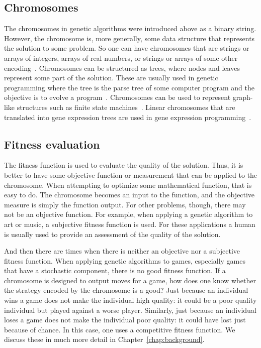 \subsection{Chromosomes}

The chromosomes in genetic algorithms were introduced above as a binary string.
However, the chromosome is, more generally, some data structure that represents
the solution to some problem. So one can have chromosomes that are strings or
arrays of integers, arrays of real numbers, or strings or arrays of some other
encoding~\cite{haupt2004practical}. Chromosomes can be structured as trees,
where nodes and leaves represent some part of the solution. These are usually
used in genetic programming where the tree is the parse tree of some computer
program and the objective is to evolve a program~\cite{koza1992genetic}.
Chromosomes can be used to represent graph-like structures such as finite state
machines~\cite{fogel1999intelligence,fogel2000evolutionary}. Linear chromosomes
that are translated into gene expression trees are used in gene expression
programming~\cite{ferreira2012gene}.

\subsection{Fitness evaluation}

The fitness function is used to evaluate the quality of the solution. Thus, it
is better to have some objective function or measurement that can be applied to
the chromosome. When attempting to optimize some mathematical function, that is
easy to do. The chromosome becomes an input to the function, and the objective
measure is simply the function output. For other problems, though, there may not
be an objective function. For example, when applying a genetic algorithm to art
or music, a subjective fitness function is used. For these applications a human
is usually used to provide an assessment of the quality of the solution.

And then there are times when there is neither an objective nor a subjective
fitness function. When applying genetic algorithms to games, especially games
that have a stochastic component, there is no good fitness function. If a
chromosome is designed to output moves for a game, how does one know whether
the strategy encoded by the chromosome is a good? Just because an individual
wins a game does not make the individual high quality: it could be a poor
quality individual but played against a worse player. Similarly, just because an
individual loses a game does not make the individual poor quality: it could have
lost just because of chance. In this case, one uses a competitive fitness
function. We discuss these in much more detail in Chapter~\ref{chap:background}.

